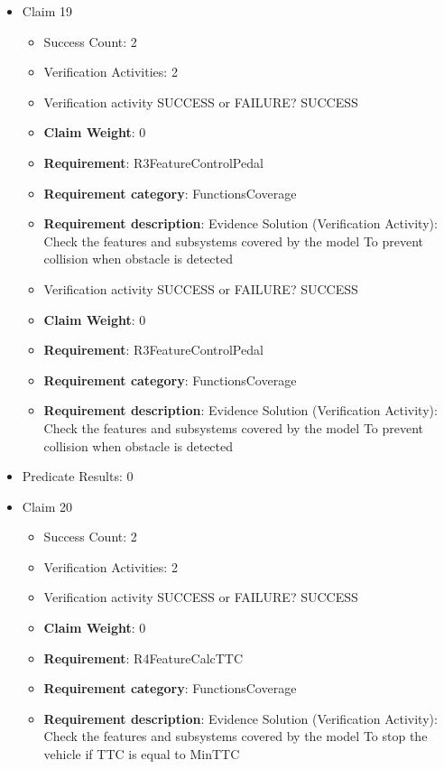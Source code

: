 \documentclass{article}
\begin{document}
\begin{itemize}
  				  \item Claim 19
				\begin{itemize}
			    	\item Success Count: 2 
			    	\item Verification Activities: 2
					\item Verification activity SUCCESS or FAILURE? SUCCESS
					\item \textbf{Claim Weight}: 0
						\item \textbf{Requirement}: R3FeatureControlPedal 
						\item \textbf{Requirement category}: FunctionsCoverage 
						\item \textbf{Requirement description}: Evidence Solution (Verification Activity): Check the features and subsystems covered by the model  To prevent collision when obstacle is detected
					
					\item Verification activity SUCCESS or FAILURE? SUCCESS
					\item \textbf{Claim Weight}: 0
						\item \textbf{Requirement}: R3FeatureControlPedal 
						\item \textbf{Requirement category}: FunctionsCoverage 
						\item \textbf{Requirement description}: Evidence Solution (Verification Activity): Check the features and subsystems covered by the model  To prevent collision when obstacle is detected
					
				\end{itemize}
				
									    
				\item Predicate Results: 0

  				  \item Claim 20
				\begin{itemize}
			    	\item Success Count: 2 
			    	\item Verification Activities: 2
					\item Verification activity SUCCESS or FAILURE? SUCCESS
					\item \textbf{Claim Weight}: 0
						\item \textbf{Requirement}: R4FeatureCalcTTC 
						\item \textbf{Requirement category}: FunctionsCoverage 
						\item \textbf{Requirement description}: Evidence Solution (Verification Activity): Check the features and subsystems covered by the model  To stop the vehicle if TTC is equal to MinTTC
					

\end{itemize}
\end{itemize}
\end{document}
